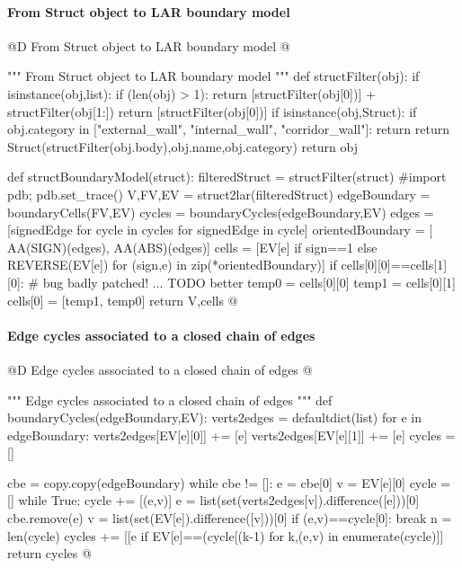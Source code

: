 \documentclass[11pt,oneside]{article}    %
\begin{document}
\paragraph{From Struct object to LAR boundary model}
@D From Struct object to LAR boundary model
@{""" From Struct object to LAR boundary model """
def structFilter(obj):
    if isinstance(obj,list):
        if (len(obj) > 1):
            return [structFilter(obj[0])] + structFilter(obj[1:])
        return [structFilter(obj[0])]
    if isinstance(obj,Struct):
        if obj.category in ["external_wall", "internal_wall", "corridor_wall"]:
            return
        return Struct(structFilter(obj.body),obj.name,obj.category)
    return obj

def structBoundaryModel(struct):
    filteredStruct = structFilter(struct)
    #import pdb; pdb.set_trace()
    V,FV,EV = struct2lar(filteredStruct)
    edgeBoundary = boundaryCells(FV,EV)
    cycles = boundaryCycles(edgeBoundary,EV)
    edges = [signedEdge for cycle in cycles for signedEdge in cycle]
    orientedBoundary = [ AA(SIGN)(edges), AA(ABS)(edges)]
    cells = [EV[e] if sign==1 else REVERSE(EV[e]) for (sign,e) in zip(*orientedBoundary)]
    if cells[0][0]==cells[1][0]: # bug badly patched! ... TODO better
        temp0 = cells[0][0]
        temp1 = cells[0][1]
        cells[0] = [temp1, temp0]
    return V,cells
@}
    

\paragraph{Edge cycles associated to a closed chain of edges}

@D Edge cycles associated to a closed chain of edges
@{""" Edge cycles associated to a closed chain of edges """
def boundaryCycles(edgeBoundary,EV):
    verts2edges = defaultdict(list)
    for e in edgeBoundary:
        verts2edges[EV[e][0]] += [e]
        verts2edges[EV[e][1]] += [e]
    cycles = []
    
    cbe = copy.copy(edgeBoundary)
    while cbe != []:
        e = cbe[0]
        v = EV[e][0]
        cycle = []
        while True:
            cycle += [(e,v)]
            e = list(set(verts2edges[v]).difference([e]))[0]
            cbe.remove(e)
            v = list(set(EV[e]).difference([v]))[0]
            if (e,v)==cycle[0]:
                break
        n = len(cycle)
        cycles += [[e if EV[e]==(cycle[(k-1)%
            for k,(e,v) in enumerate(cycle)]]
    return cycles
@}
\end{document}
